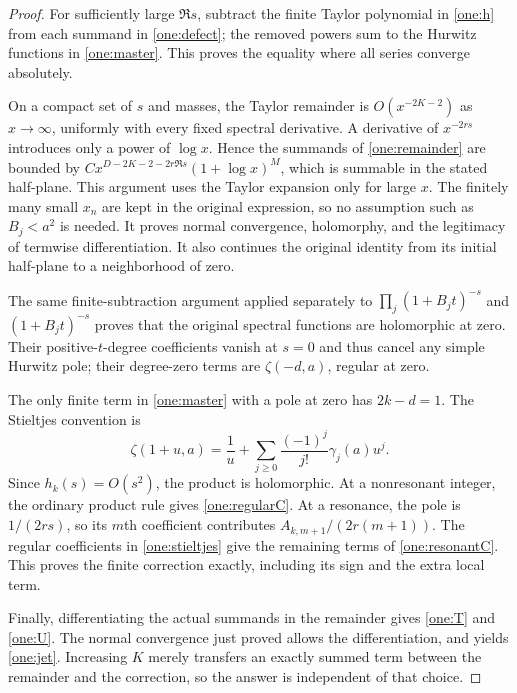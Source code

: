\documentclass[11pt,a4paper]{article}
\numberwithin{equation}{section}
\theoremstyle{plain}
\theoremstyle{definition}
\theoremstyle{remark}
\begin{document}
\begin{proof}
For sufficiently large $\Re s$, subtract the finite Taylor polynomial
in \eqref{one:h} from each summand in \eqref{one:defect}; the removed
powers sum to the Hurwitz functions in \eqref{one:master}.  This proves
the equality where all series converge absolutely.

On a compact set of $s$ and masses, the Taylor remainder is
$O(x^{-2K-2})$ as $x\to\infty$, uniformly with every fixed spectral
derivative.  A derivative of $x^{-2rs}$ introduces only a power of
$\log x$.  Hence the summands of \eqref{one:remainder} are bounded
by $C x^{D-2K-2-2r\Re s}(1+\log x)^M$, which is summable in the
stated half-plane.  This argument uses the Taylor expansion only for
large $x$.  The finitely many small $x_n$ are kept in the original
expression, so no assumption such as $B_j<a^2$ is needed.
It proves normal convergence, holomorphy, and the legitimacy of
termwise differentiation.  It also continues the original identity
from its initial half-plane to a neighborhood of zero.

The same finite-subtraction argument applied separately to
$\prod_j(1+B_jt)^{-s}$ and $(1+B_jt)^{-s}$ proves that the original
spectral functions are holomorphic at zero.  Their positive-$t$-degree
coefficients vanish at $s=0$ and thus cancel any simple Hurwitz pole;
their degree-zero terms are $\zeta(-d,a)$, regular at zero.

The only finite term in \eqref{one:master} with a pole at zero has
$2k-d=1$.  The Stieltjes convention is
\begin{equation}\label{one:stieltjes}
 \zeta(1+u,a)=\frac1u+
                 \sum_{j\ge0}\frac{(-1)^j}{j!}\gamma_j(a)u^j.
\end{equation}
Since $h_k(s)=O(s^2)$, the product is holomorphic.  At a nonresonant
integer, the ordinary product rule gives \eqref{one:regularC}.
At a resonance, the pole is $1/(2rs)$, so its $m$th coefficient
contributes $A_{k,m+1}/(2r(m+1))$.  The regular coefficients in
\eqref{one:stieltjes} give the remaining terms of
\eqref{one:resonantC}.  This proves the finite correction exactly,
including its sign and the extra local term.

Finally, differentiating the actual summands in the remainder gives
\eqref{one:T} and \eqref{one:U}.  The normal convergence just proved
allows the differentiation, and yields \eqref{one:jet}.  Increasing
$K$ merely transfers an exactly summed term between the remainder
and the correction, so the answer is independent of that choice.
\end{proof}
\end{document}
